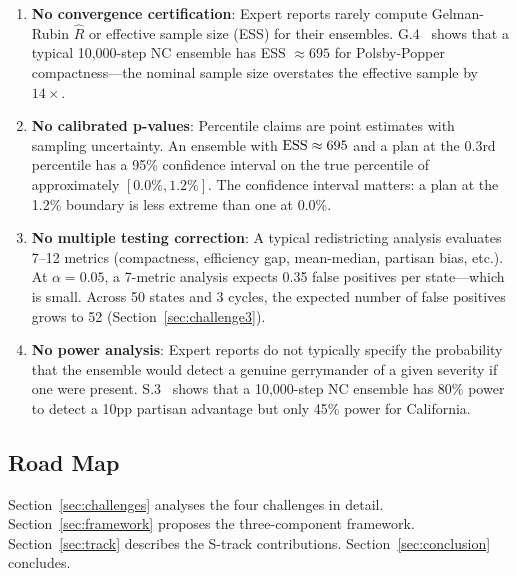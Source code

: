 \begin{enumerate}
\item \textbf{No convergence certification}: Expert reports rarely
  compute Gelman-Rubin $\hat{R}$ or effective sample size (ESS) for
  their ensembles.
  G.4~\citep{g4paper} shows that a typical 10,000-step NC ensemble
  has ESS $\approx 695$ for Polsby-Popper compactness---the nominal
  sample size overstates the effective sample by $14\times$.
\item \textbf{No calibrated p-values}: Percentile claims are point
  estimates with sampling uncertainty.
  An ensemble with $\mathrm{ESS} \approx 695$ and a plan at the 0.3rd percentile
  has a 95\% confidence interval on the true percentile of approximately
  $[0.0\%, 1.2\%]$.
  The confidence interval matters: a plan at the 1.2\% boundary is
  less extreme than one at 0.0\%.
\item \textbf{No multiple testing correction}: A typical redistricting
  analysis evaluates 7--12 metrics (compactness, efficiency gap,
  mean-median, partisan bias, etc.).
  At $\alpha = 0.05$, a 7-metric analysis expects 0.35 false positives
  per state---which is small.
  Across 50 states and 3 cycles, the expected number of false positives
  grows to 52 (Section~\ref{sec:challenge3}).
\item \textbf{No power analysis}: Expert reports do not typically specify
  the probability that the ensemble would detect a genuine gerrymander
  of a given severity if one were present.
  S.3~\citep{s3paper} shows that a 10,000-step NC ensemble has 80\%
  power to detect a 10pp partisan advantage but only 45\% power for
  California.
\end{enumerate}

\subsection{Road Map}

Section~\ref{sec:challenges} analyses the four challenges in detail.
Section~\ref{sec:framework} proposes the three-component framework.
Section~\ref{sec:track} describes the S-track contributions.
Section~\ref{sec:conclusion} concludes.
